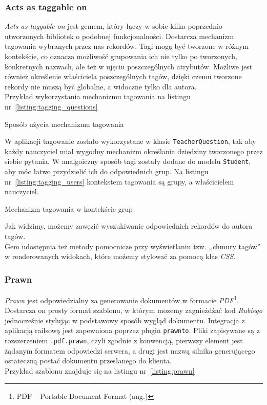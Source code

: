 \documentclass[a4paper,12pt]{article}
\begin{document}
\subsubsection{Acts as taggable on}\label{sec:acts_as_taggable_on}
\emph{Acts as taggable on} jest gemem, który łączy w sobie kilka poprzednio utworzonych
bibliotek o podobnej funkcjonalności. Dostarcza mechanizm tagowania wybranych przez
nas rekordów. Tagi mogą być tworzone w różnym kontekście, co oznacza możliwość grupowania
ich nie tylko po tworzonych, konkretnych nazwach, ale też w ujęciu poszczególnych
atrybutów. Możliwe jest również określenie właściciela poszczególnych tagów, dzięki czemu
tworzone rekordy nie muszą być globalne, a widoczne tylko dla autora.\\
Przykład wykorzystania mechanizmu tagowania na listingu nr~\ref{listing:tagging_questions}

\begin{listing}
  
  \caption{Sposób użycia mechanizmu tagowania}
  \label{listing:tagging_questions}
\end{listing}


W aplikacji tagowanie zostało wykorzystane w klasie \texttt{TeacherQuestion}, tak aby
każdy nauczyciel miał wygodny mechanizm określania dziedziny tworzonego przez siebie
pytania. W analgoiczny sposób tagi zostały dodane do modelu \texttt{Student}, aby móc
łatwo przydzielić ich do odpowiednich grup. Na listingu nr~\ref{listing:tagging_users}
kontekstem tagowania są grupy, a właścicielem nauczyciel.

\begin{listing}
  
  \caption{Mechanizm tagowania w kontekście grup}
  \label{listing:tagging_users}
\end{listing}


Jak widzimy, możemy zawęzić wyszukiwanie odpowiednich rekordów do autora tagów.\\
Gem udostępnia też metody pomocnicze przy wyświetlaniu tzw. ,,chmury tagów'' w
renderowanych widokach, które możemy stylować za pomocą klas \emph{CSS}.

\subsubsection{Prawn}
\emph{Prawn} jest odpowiedzialny za generowanie dokumentów w formacie
\emph{PDF}\footnote{PDF -- Portable Document Format (ang.)}. Dostarcza on prosty format
szablonu, w którym mozemy zagnieżdżać kod \emph{Rubiego} jednocześnie stylując
w podstawowy sposób wygląd dokumentu. Integracja z aplikacją railsową jest zapewniona
poprzez plugin \texttt{prawnto}. Pliki zapisywane są z rozszerzeniem \texttt{.pdf.prawn},
czyli zgodnie z konwencją, pierwszy element jest żądanym formatem odpowiedzi serwera,
a drugi jest nazwą silnika generującego ostateczną postać dokumentu przesłanego do klienta.\\
Przykład szablonu znajduje się na listingu nr~\ref{listing:prawn}
\end{document}
